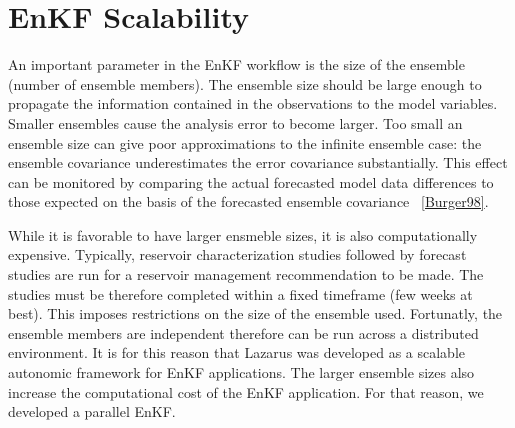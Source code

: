 \documentclass{rspublic}
\begin{document}
\section{EnKF Scalability}
An important parameter in the EnKF workflow is the size of the ensemble (number of ensemble members). The ensemble size should be large enough to propagate the information contained in the observations to the model variables. Smaller ensembles cause the analysis error to become larger. Too small an ensemble size can give poor approximations to the infinite ensemble case: the ensemble covariance underestimates the error covariance substantially. This effect can be monitored by comparing the actual forecasted model data differences to those expected on the basis of the forecasted ensemble covariance ~\ref{Burger98}.

While it is favorable to have larger ensmeble sizes, it is also computationally expensive. Typically, reservoir characterization studies followed by forecast studies are run for a reservoir management recommendation to be made. The studies must be therefore completed within a fixed timeframe (few weeks at best). This imposes restrictions on the size of the ensemble used. Fortunatly, the ensemble members are independent therefore can be run across a distributed environment. It is for this reason that Lazarus was developed as a scalable autonomic framework for EnKF applications. The larger ensemble sizes also increase the computational cost of the EnKF application. For that reason, we developed a parallel EnKF.
\end{document}
